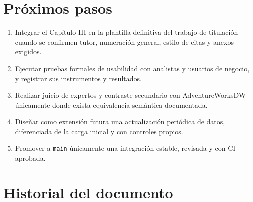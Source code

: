 \documentclass[11pt,letterpaper]{article}
\newcommand{\file}[1]{\texttt{#1}}
\begin{document}
\clearpage
\section{Próximos pasos}

\begin{enumerate}
  \item Integrar el Capítulo III en la plantilla definitiva del trabajo de titulación cuando se confirmen tutor, numeración general, estilo de citas y anexos exigidos.
  \item Ejecutar pruebas formales de usabilidad con analistas y usuarios de negocio, y registrar sus instrumentos y resultados.
  \item Realizar juicio de expertos y contraste secundario con AdventureWorksDW únicamente donde exista equivalencia semántica documentada.
  \item Diseñar como extensión futura una actualización periódica de datos, diferenciada de la carga inicial y con controles propios.
  \item Promover a \file{main} únicamente una integración estable, revisada y con CI aprobada.
\end{enumerate}

\section{Historial del documento}
\end{document}
